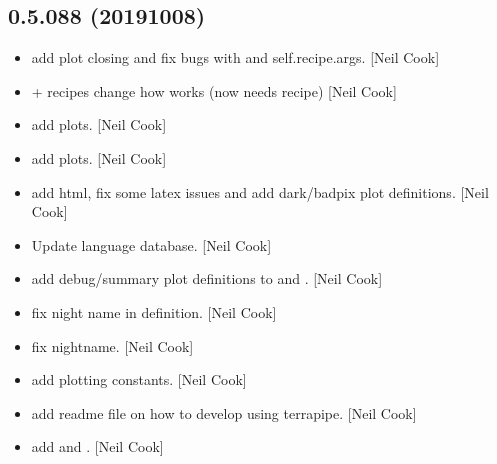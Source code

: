 \documentclass[a4paper,10pt,english]{report}
\begin{document}
\subsection{0.5.088 (2019\sphinxhyphen{}10\sphinxhyphen{}08)}
\label{\detokenize{misc/changelog:id73}}\begin{itemize}
\item {} 
 \sphinxhyphen{} add plot closing and fix bugs
with  and self.recipe.args. {[}Neil Cook{]}

\item {} 
 +  recipes \sphinxhyphen{} change how  works
(now needs recipe) {[}Neil Cook{]}

\item {} 
 \sphinxhyphen{} add plots. {[}Neil Cook{]}

\item {} 
 \sphinxhyphen{} add plots. {[}Neil Cook{]}

\item {} 
 \sphinxhyphen{} add html, fix some latex issues and add dark/badpix
plot definitions. {[}Neil Cook{]}

\item {} 
Update language database. {[}Neil Cook{]}

\item {} 
 \sphinxhyphen{} add debug/summary plot
definitions to  and . {[}Neil Cook{]}

\item {} 
 \sphinxhyphen{} fix night name in
 definition. {[}Neil Cook{]}

\item {} 
 \sphinxhyphen{} fix nightname. {[}Neil Cook{]}

\item {} 
 \sphinxhyphen{} add plotting constants. {[}Neil Cook{]}

\item {} 
 \sphinxhyphen{} add readme file on how to develop using
terrapipe. {[}Neil Cook{]}

\item {} 
 add  and .
{[}Neil Cook{]}

\end{itemize}
\end{document}
